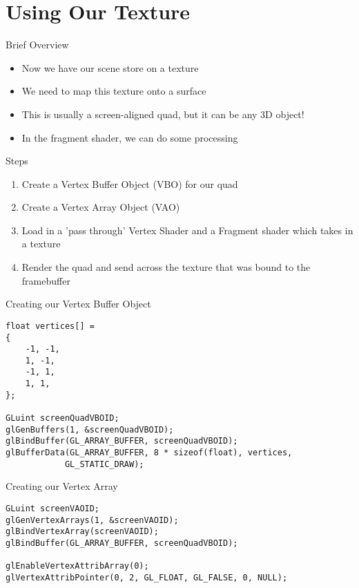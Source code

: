 \part{Using Our Texture}
\frame{\partpage}

\begin{frame}{Brief Overview}
	\begin{itemize}
		\item\pause Now we have our scene store on a texture
		\item\pause We need to map this texture onto a surface
		\item\pause This is usually a screen-aligned quad, but it can be any 3D object!
		\item\pause In the fragment shader, we can do some processing
	\end{itemize}
\end{frame}

\begin{frame}{Steps}
	\begin{enumerate}
		\item\pause Create a Vertex Buffer Object (VBO) for our quad
		\item\pause Create a Vertex Array Object (VAO)
		\item\pause Load in a 'pass through' Vertex Shader and a Fragment shader which takes in a texture
		\item\pause Render the quad and send across the texture that was bound to the framebuffer
	\end{enumerate}
\end{frame}

\begin{frame}[fragile]{Creating our Vertex Buffer Object}
	\begin{lstlisting}
float vertices[] =
{
	-1, -1,
	1, -1,
	-1, 1,
	1, 1,
};

GLuint screenQuadVBOID;
glGenBuffers(1, &screenQuadVBOID);
glBindBuffer(GL_ARRAY_BUFFER, screenQuadVBOID);
glBufferData(GL_ARRAY_BUFFER, 8 * sizeof(float), vertices,
			GL_STATIC_DRAW);
	\end{lstlisting}
\end{frame}

\begin{frame}[fragile]{Creating our Vertex Array}
	\begin{lstlisting}
GLuint screenVAOID;
glGenVertexArrays(1, &screenVAOID);
glBindVertexArray(screenVAOID);
glBindBuffer(GL_ARRAY_BUFFER, screenQuadVBOID);

glEnableVertexAttribArray(0);
glVertexAttribPointer(0, 2, GL_FLOAT, GL_FALSE, 0, NULL);
	\end{lstlisting}
\end{frame}

